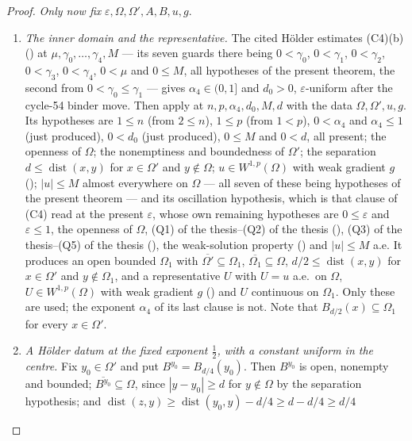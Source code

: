 \begin{proof}
\emph{Only now fix} $\varepsilon,\Omega,\Omega',A,B,u,g$.
\begin{enumerate}
\item[(2a)] \emph{The inner domain and the representative.}  The
  cited H\"older estimates (C4)(b) () at
  $\mu,\gamma_0,\dots,\gamma_4,M$ --- its seven guards there being $0<\gamma_0$,
  $0<\gamma_1$, $0<\gamma_2$, $0<\gamma_3$, $0<\gamma_4$, $0<\mu$ and
  $0\le M$, all hypotheses of the present theorem, the second from
  $0<\gamma_0\le\gamma_1$ --- gives $\alpha_4\in(0,1]$ and $d_0>0$,
  $\varepsilon$-uniform after the cycle-54 binder move.  Then apply
   at $n,p,\alpha_4,d_0,M,d$ with the data
  $\Omega,\Omega',u,g$.  Its hypotheses are $1\le n$ (from $2\le n$), $1\le p$
  (from $1<p$), $0<\alpha_4$ and $\alpha_4\le1$ (just produced), $0<d_0$ (just
  produced), $0\le M$ and $0<d$, all present; the openness of $\Omega$; the
  nonemptiness and boundedness of $\Omega'$; the separation
  $d\le\operatorname{dist}(x,y)$ for $x\in\Omega'$ and $y\notin\Omega$;
  $u\in W^{1,p}(\Omega)$ with weak gradient $g$ (); $|u|\le M$
  almost everywhere on $\Omega$ --- all seven of these being hypotheses of the
  present theorem --- and its oscillation hypothesis, which is that clause of
  (C4) read at the present $\varepsilon$, whose own remaining hypotheses are
  $0\le\varepsilon$ and $\varepsilon\le1$, the openness of
  $\Omega$, (Q1) of the thesis--(Q2) of the thesis (),
  (Q3) of the thesis--(Q5) of the thesis (), the
  weak-solution property () and $|u|\le M$ a.e.  It
  produces an open bounded $\Omega_1$ with
  $\overline{\Omega'}\subseteq\Omega_1$, $\overline{\Omega_1}\subseteq\Omega$,
  $d/2\le\operatorname{dist}(x,y)$ for $x\in\Omega'$ and $y\notin\Omega_1$, and
  a representative $U$ with $U=u$ a.e.\ on $\Omega$, $U\in W^{1,p}(\Omega)$ with
  weak gradient $g$ () and $U$ continuous on $\Omega_1$.  Only
  these are used; the exponent $\alpha_4$ of its last clause is not.  Note that
  $B_{d/2}(x)\subseteq\Omega_1$ for every $x\in\Omega'$.
\item[(2a$'$)] \emph{A H\"older datum at the fixed exponent $\tfrac12$, with a
  constant uniform in the centre.}  Fix $y_0\in\Omega'$ and put
  $B^{y_0}=B_{d/4}(y_0)$.  Then $B^{y_0}$ is open, nonempty and bounded;
  $\overline{B^{y_0}}\subseteq\Omega$, since $|y-y_0|\ge d$ for $y\notin\Omega$
  by the separation hypothesis; and
  $\operatorname{dist}(z,y)\ge\operatorname{dist}(y_0,y)-d/4\ge d-d/4\ge d/4$

\end{enumerate}
\end{proof}
